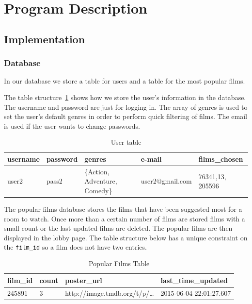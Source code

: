 \documentclass{article}
\begin{document}
\section{Program Description}
\subsection{Implementation}
\subsubsection{Database}
In our database we store a table for users and a table for the most popular films. 

The table structure~\ref{tab:usertable} shows how we store the user’s information in the database. The username and password are just for logging in. The array of genres is used to set the user’s default genres in order to perform quick filtering of films. The email is used if the user wants to change passwords.

\begin{table}[h]
\centering
\caption{User table}
\label{tab:usertable}
\begin{tabular}{|l|l|l|l|l|}
\hline
username & password & genres                        & e-mail  & films\_chosen        \\ \hline
user2    & pass2    & \{Action, Adventure, Comedy\} & user2@gmail.com & {76341,13, 205596 } \\ \hline
\end{tabular}
\end{table}

The popular films database stores the films that have been suggested most for a room to watch. Once more than a certain number of films are stored films with a small count or the last updated films are deleted. The popular films are then displayed in the lobby page. The table structure below has a unique constraint on the \texttt{film\_id} so a film does not have two entries. 

\begin{table}[h]
\centering
\caption{Popular Films Table}
\label{filmtable}
\begin{tabular}{|l|l|l|l|}
\hline
film\_id & count & poster\_url & last\_time\_updated     \\ \hline
245891 & 3 & http://image.tmdb.org/t/p/\dots & 2015-06-04 22:01:27.607 \\ \hline
\end{tabular}
\end{table}
\end{document}
